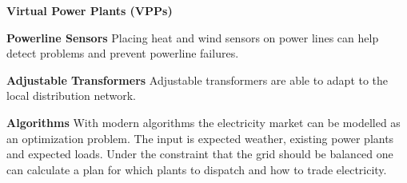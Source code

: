 \begin{labeling}{\textbf{Virtual Power Plants (VPPs)}}
    \item [\textbf{Powerline Sensors}]
    Placing heat and wind sensors on power lines can help detect problems and prevent powerline failures.


    \item [\textbf{Adjustable Transformers}]
    Adjustable transformers are able to adapt to the local distribution network.


    \item [\textbf{Algorithms}]
    With modern algorithms the electricity market can be modelled as an optimization problem. The input is expected weather, existing power plants and expected loads. Under the constraint that the grid should be balanced one can calculate a plan for which plants to dispatch and how to trade electricity.

\end{labeling}

